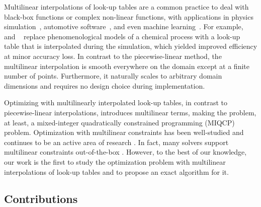\documentclass[pdflatex,sn-mathphys-num]{sn-jnl}%
\newcommand{\new}[1]{#1}
\begin{document}
Multilinear interpolations of look-up tables are a common practice to deal with black-box functions or complex non-linear functions, with applications in physics simulation~\citep{gastellu-etchegorryInterpolationProcedureGeneralizing2003,piniConsistentLookupTable2015}, automotive software~\citep{nellesGridBasedLookUpTable2000,nellesLinearPolynomialLookUp2020,bohnOptimizationbasedApproachCalibration2006a}, and even machine learning~\citep{guptaMonotonicCalibratedInterpolated2016}.
For example, \citeauthor{furlanSimpleApproachImprove2016}~\cite{furlanSimpleApproachImprove2016} and \citeauthor{martinsImplementationMultilinearLookup2020}~\cite{martinsImplementationMultilinearLookup2020} replace phenomenological models of a chemical process with a look-up table that is interpolated during the simulation, which yielded improved efficiency at minor accuracy loss.
\new{%
In contrast to the piecewise-linear method, the multilinear interpolation is smooth everywhere on the domain except at a finite number of points.
Furthermore, it naturally scales to arbitrary domain dimensions and requires no design choice during implementation.
}

Optimizing with multilinearly interpolated look-up tables, in contrast to piecewise-linear interpolations, introduces multilinear terms, making the problem, at least, a mixed-integer quadratically constrained programming (MIQCP) problem. 
Optimization with multilinear constraints has been well-studied \cite{rikunConvexEnvelopeFormula1997,kehaModelsRepresentingPiecewise2004,McCormick1976} and continues to be an active area of research \cite{sundarPiecewisePolyhedralFormulations2021,kimPiecewisePolyhedralRelaxations2024}.
In fact, many solvers support multilinear constraints out-of-the-box \cite{gurobi,gleixnerExactFastAlgorithms2015}.
However, to the best of our knowledge, our work is the first to study the optimization problem with multilinear interpolations of look-up tables and to propose an exact algorithm for it.


\subsection{Contributions}
\end{document}
